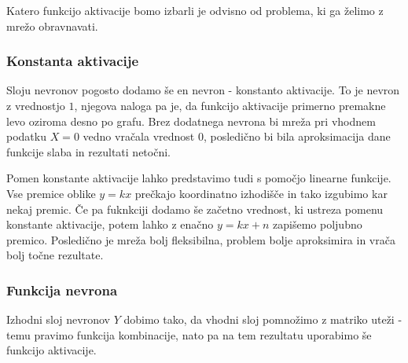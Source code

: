 \documentclass[mat1]{fmfdelo}
\begin{document}
Katero funkcijo aktivacije bomo izbarli je odvisno od problema, ki ga želimo z mrežo obravnavati.
%
\subsubsection{Konstanta aktivacije} \label{bias}
Sloju nevronov pogosto dodamo še en nevron - konstanto aktivacije. To je nevron z vrednostjo $1$, njegova naloga pa je, da funkcijo aktivacije primerno premakne levo oziroma desno po grafu. Brez dodatnega nevrona bi mreža pri vhodnem podatku $X=0$ vedno vračala vrednost $0$, posledično bi bila aproksimacija dane funkcije slaba in rezultati netočni. 

Pomen konstante aktivacije lahko predstavimo tudi s pomočjo linearne funkcije. Vse premice oblike $y = kx$ prečkajo koordinatno izhodišče in tako izgubimo kar nekaj premic. Če pa fuknkciji dodamo še začetno vrednost, ki ustreza pomenu konstante aktivacije, potem lahko z enačno $y= kx + n$ zapišemo poljubno premico. Posledično je mreža bolj fleksibilna, problem bolje aproksimira in vrača bolj točne rezultate. 
%
\subsubsection{Funkcija nevrona}
Izhodni sloj nevronov $Y$ dobimo tako, da vhodni sloj pomnožimo z matriko uteži - temu pravimo funkcija kombinacije, nato pa na tem rezultatu uporabimo še funkcijo aktivacije.\\
%
\end{document}
